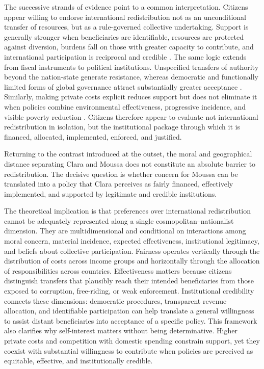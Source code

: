 \documentclass[11pt,a4paper]{article}
\begin{document}
The successive strands of evidence point to a common interpretation. Citizens appear willing to endorse international redistribution not as an unconditional transfer of resources, but as a rule-governed collective undertaking. Support is generally stronger when beneficiaries are identifiable, resources are protected against diversion, burdens fall on those with greater capacity to contribute, and international participation is reciprocal and credible \citep{fabre_majority_2025,fabre_public_2026,gampfer_obtaining_2014}. The same logic extends from fiscal instruments to political institutions. Unspecified transfers of authority beyond the nation-state generate resistance, whereas democratic and functionally limited forms of global governance attract substantially greater acceptance \citep{ghassim_who_2024}. Similarly, making private costs explicit reduces support but does not eliminate it when policies combine environmental effectiveness, progressive incidence, and visible poverty reduction \citep{bechtel_mass_2013,fabre_public_2026}. Citizens therefore appear to evaluate not international redistribution in isolation, but the institutional package through which it is financed, allocated, implemented, enforced, and justified.

Returning to the contrast introduced at the outset, the moral and geographical distance separating Clara and Moussa does not constitute an absolute barrier to redistribution. The decisive question is whether concern for Moussa can be translated into a policy that Clara perceives as fairly financed, effectively implemented, and supported by legitimate and credible institutions.

The theoretical implication is that preferences over international redistribution cannot be adequately represented along a single cosmopolitan--nationalist dimension. They are multidimensional and conditional on interactions among moral concern, material incidence, expected effectiveness, institutional legitimacy, and beliefs about collective participation. Fairness operates vertically through the distribution of costs across income groups and horizontally through the allocation of responsibilities across countries. Effectiveness matters because citizens distinguish transfers that plausibly reach their intended beneficiaries from those exposed to corruption, free-riding, or weak enforcement. Institutional credibility connects these dimensions: democratic procedures, transparent revenue allocation, and identifiable participation can help translate a general willingness to assist distant beneficiaries into acceptance of a specific policy. This framework also clarifies why self-interest matters without being determinative. Higher private costs and competition with domestic spending constrain support, yet they coexist with substantial willingness to contribute when policies are perceived as equitable, effective, and institutionally credible.
\end{document}
